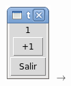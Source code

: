 \documentclass[12pt]{beamer}
\begin{document}
\begin{frame}
\begin{columns}
        \includegraphics[width=\textwidth]{programas/tkinter/capturas/06-1.png}
        \(\longrightarrow\)

\end{columns}
\end{frame}
\end{document}
